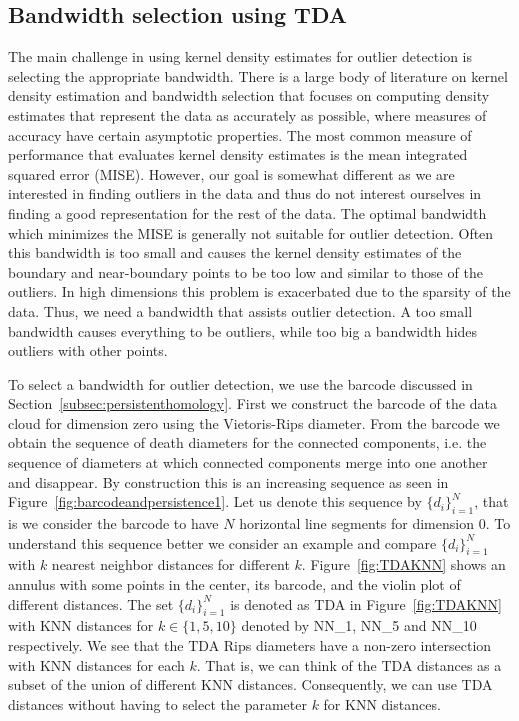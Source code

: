 \documentclass[letter,12pt]{article}
\begin{document}
\subsection{Bandwidth selection using TDA}\label{subsec:selectingBandwidth}
The main challenge in using kernel density estimates for outlier detection is selecting the appropriate bandwidth. There is a large body of literature on kernel density estimation and bandwidth selection \citep{Scott1994,Wang2019} that  focuses on computing density estimates that represent the data as accurately as possible, where measures of accuracy have certain asymptotic properties. The most common measure of performance that evaluates kernel density estimates is the mean integrated squared error (MISE). However, our goal is somewhat different as we are interested in finding outliers in the data and thus do not interest ourselves in finding a good representation for the rest of the data. The optimal bandwidth which minimizes the MISE is generally not suitable for outlier detection.  Often this bandwidth is too small and causes the kernel density estimates of the boundary and near-boundary points to be too low and similar to those of the outliers. In high dimensions this problem is exacerbated due to the sparsity of the data. Thus, we need a bandwidth that assists outlier detection. A too small bandwidth causes everything to be outliers, while too big a bandwidth hides outliers with other points.  

To select a bandwidth for outlier detection, we use the barcode  discussed in Section~\ref{subsec:persistenthomology}. First we construct the barcode of the data cloud for dimension zero using the Vietoris-Rips diameter. From the barcode we obtain the sequence of death diameters for the connected components, i.e. the sequence of diameters at which connected components merge into one another and disappear. By construction this is an increasing sequence as seen in Figure~\ref{fig:barcodeandpersistence1}. Let us denote this sequence by $\{d_i\}_{i = 1}^N$, that is we consider the barcode to have $N$ horizontal line segments for dimension $0$. To understand this sequence better we consider an example and compare $\{d_i\}_{i = 1}^N$ with $k$ nearest neighbor distances for different $k$. Figure~\ref{fig:TDAKNN} shows an annulus with some points in the center, its barcode, and the violin plot of different distances. The set $\{d_i\}_{i = 1}^N$ is denoted as TDA in Figure~\ref{fig:TDAKNN} with KNN distances for $k \in \{1, 5, 10\}$ denoted by NN\_1, NN\_5 and NN\_10 respectively. We see that the TDA Rips diameters have a non-zero intersection with KNN distances for each $k$. That is, we can think of the TDA distances as a subset of the union of different KNN distances. Consequently, we can use TDA distances without having to select the parameter $k$ for KNN distances.  
\end{document}
